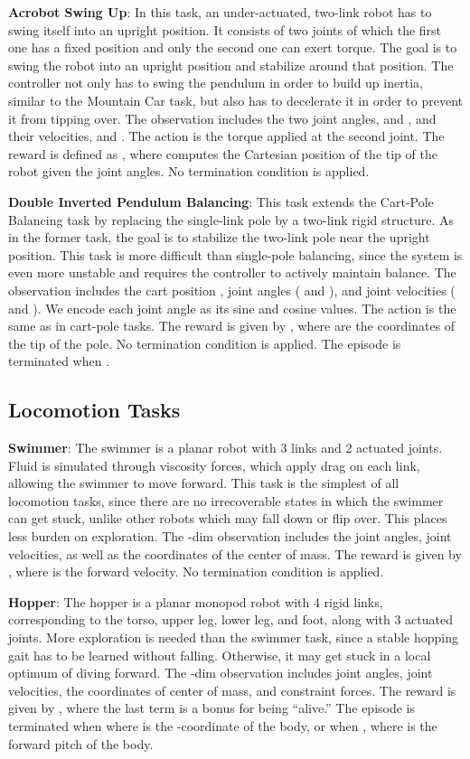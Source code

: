 \documentclass{article}
\begin{document}
{\bf Acrobot Swing Up}: In this task, an under-actuated, two-link robot has to swing itself into an upright position. It consists of two joints of which the first one has a fixed position and only the second one can exert torque. The goal is to swing the robot into an upright position and stabilize around that position. The controller not only has to swing the pendulum in order to build up inertia, similar to the Mountain Car task, but also has to decelerate it in order to prevent it from tipping over. The observation includes the two joint angles,  and , and their velocities,  and . The action is the torque applied at the second joint. The reward is defined as , where  computes the Cartesian position of the tip of the robot given the joint angles. No termination condition is applied.

{\bf Double Inverted Pendulum Balancing}: This task extends the Cart-Pole Balancing task by replacing the single-link pole by a two-link rigid structure. As in the former task, the goal is to stabilize the two-link pole near the upright position. This task is more difficult than single-pole balancing, since the system is even more unstable and requires the controller to actively maintain balance. The observation includes the cart position , joint angles ( and ), and joint velocities ( and ). We encode each joint angle as its sine and cosine values. The action is the same as in cart-pole tasks. The reward is given by , where  are the coordinates of the tip of the pole.
No termination condition is applied. The episode is terminated when .

\subsection{Locomotion Tasks}

{\bf Swimmer}: The swimmer is a planar robot with 3 links and 2 actuated joints. Fluid is simulated through viscosity forces, which apply drag on each link, allowing the swimmer to move forward. This task is the simplest of all locomotion tasks, since there are no irrecoverable states in which the swimmer can get stuck, unlike other robots which may fall down or flip over. This places less burden on exploration. The -dim observation includes the joint angles, joint velocities, as well as the coordinates of the center of mass. The reward is given by , where  is the forward velocity. No termination condition is applied.


{\bf Hopper}: The hopper is a planar monopod robot with 4 rigid links, corresponding to the torso, upper leg, lower leg, and foot, along with 3 actuated joints. More exploration is needed than the swimmer task, since a stable hopping gait has to be learned without falling. Otherwise, it may get stuck in a local optimum of diving forward. The -dim observation includes joint angles, joint velocities, the coordinates of center of mass, and constraint forces. The reward is given by
,
where the last term is a bonus for being ``alive.'' The episode is terminated when  where  is the -coordinate of the body, or when , where  is the forward pitch of the body.
\end{document}
